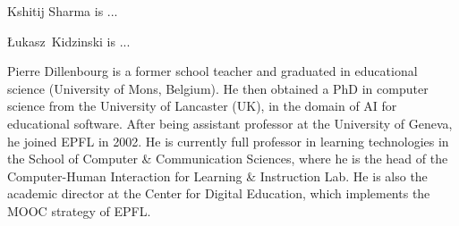 \documentclass[10pt,journal,compsoc]{IEEEtran}
\begin{document}
\begin{IEEEbiography}{Kshitij Sharma}
 is ...
\end{IEEEbiography}

\begin{IEEEbiography}{{\L}ukasz~Kidzinski}
 is ...
\end{IEEEbiography}


\begin{IEEEbiography}{Pierre Dillenbourg} is a former school teacher and graduated in educational science (University of Mons, Belgium). He then obtained a PhD in computer science from the University of Lancaster (UK), in the domain of AI for educational software. After being assistant professor at the University of Geneva, he joined EPFL in 2002. He is currently full professor in learning technologies in the School of Computer \& Communication Sciences, where he is the head of the Computer-Human Interaction for Learning \& Instruction Lab. He is also the academic director at the Center for Digital Education, which implements the MOOC strategy of EPFL.
\end{IEEEbiography}






\end{document}
